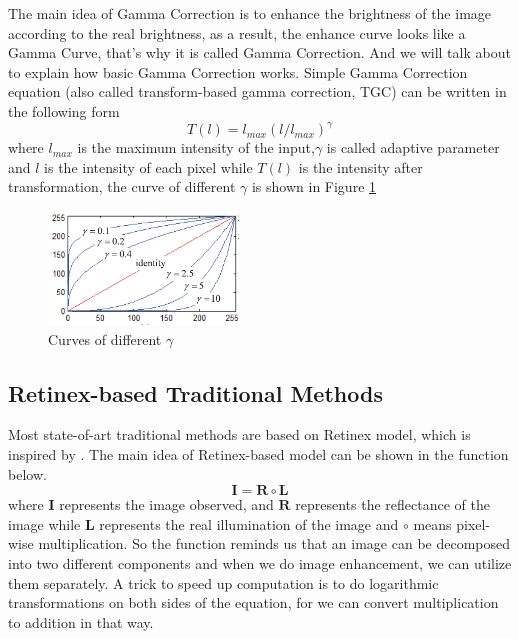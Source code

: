 \documentclass[10pt,twocolumn,letterpaper]{article}
\begin{document}
The main idea of Gamma Correction is to enhance the brightness of the image according to the real brightness, as a result, the enhance curve looks like a Gamma Curve, that's why it is called Gamma Correction. And we will talk about \cite{Huang2013Efficient} to explain how basic Gamma Correction works. Simple Gamma Correction equation (also called transform-based gamma correction, TGC) can be written in the following form
\begin{equation}
    T(l)=l_{max}(l/l_{max})^\gamma
\end{equation}
where $l_{max}$ is the maximum intensity of the input,$\gamma$ is called adaptive parameter and $l$ is the intensity of each pixel while $T(l)$ is the intensity after transformation, the curve of different $\gamma$ is shown in Figure \ref{fig:GC}
\begin{figure}
    \centering
    \includegraphics[width=0.45\textwidth]{latex/Gamma_correction.png}
    \caption{Curves of different $\gamma$ \cite{Huang2013Efficient}}
    \label{fig:GC}
\end{figure}
\subsection{Retinex-based Traditional Methods}
Most state-of-art traditional methods are based on Retinex model, which is inspired by \cite{land1977retinex}. The main idea of Retinex-based model can be shown in the function below.
\begin{equation}
    \mathbf{I = R \circ L} 
\end{equation}
where $\textbf{I}$ represents the image observed, and $\textbf{R}$ represents the reflectance of the image while $\textbf{L}$ represents the real illumination of the image and $\circ$ means pixel-wise multiplication. So the function reminds us that an image can be decomposed into two different components and when we do image enhancement, we can utilize them separately. A trick to speed up computation is to do logarithmic transformations on both sides of the equation, for we can convert multiplication to addition in that way.
\end{document}
